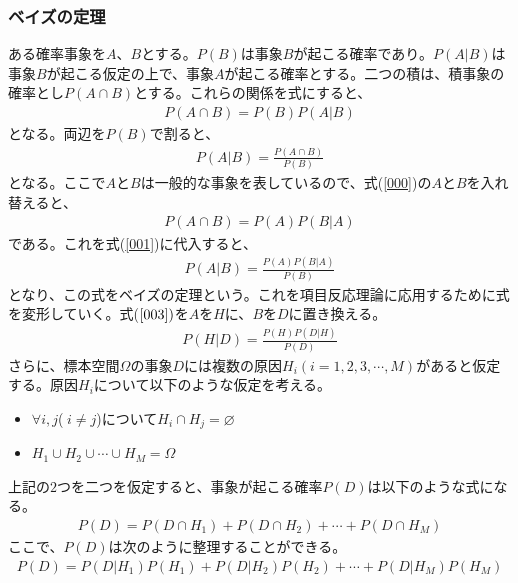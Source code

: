 \documentclass[12pt]{jarticle}
\numberwithin{equation}{subsection}
\begin{document}
\subsubsection{ベイズの定理}
  ある確率事象を$A$、$B$とする。$P(B)$は事象$B$が起こる確率であり。$P(A|B)$は事象$B$が起こる仮定の上で、事象$A$が起こる確率とする。二つの積は、積事象の確率とし$P(A \cap B)$とする。これらの関係を式にすると、
  \begin{align}
    \label{000}
    \displaystyle P(A \cap B) = P(B)P(A|B)
  \end{align}
  となる。両辺を$P(B)$で割ると、
  \begin{align}
    \label{001}
    \displaystyle P(A|B) = \frac{P(A \cap B)}{P(B)}
  \end{align}
  となる。ここで$A$と$B$は一般的な事象を表しているので、式(\ref{000})の$A$と$B$を入れ替えると、
  \begin{align}
    \displaystyle P(A \cap B) = P(A)P(B|A)
    \end{align}
  である。これを式(\ref{001})に代入すると、
  \begin{align}
    \label{003}
    \displaystyle P(A|B) = \frac{P(A)P(B|A)}{P(B)}
  \end{align}
  となり、この式をベイズの定理という。これを項目反応理論に応用するために式を変形していく。式($\ref{003})$を$A$を$H$に、$B$を$D$に置き換える。
  \begin{align}
    \label{0004}
    \displaystyle
    P(H|D) = \frac{P(H)P(D|H)}{P(D)}
  \end{align}
  さらに、標本空間$\Omega$の事象$D$には複数の原因$H_i (i = 1, 2, 3, \cdots, M)$があると仮定する。原因$H_i$について以下のような仮定を考える。
  \begin{itemize}
    \item $\forall i, j $($\hspace{3pt} i \neq j$)について$H_i \cap H_j = \varnothing$
    \item $H_1 \cup H_2  \cup \cdots \cup H_M = \Omega$
  \end{itemize}
  上記の$2$つを二つを仮定すると、事象が起こる確率$P(D)$は以下のような式になる。
  \begin{align}
    \label{0005}
    \displaystyle
    P(D) = P(D \cap H_1) + P(D \cap H_2)  + \cdots + P(D \cap H_M)
  \end{align}
  ここで、$P(D)$は次のように整理することができる。
  \begin{align}
    \label{0006}
    \displaystyle
    P(D) = P(D|H_1)P(H_1) + P(D|H_2)P(H_2) + \cdots + P(D|H_M)P(H_M)
  \end{align}
\end{document}
